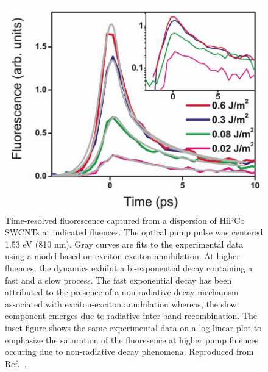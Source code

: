 \begin{figure}[H]
	\centering
	\includegraphics[scale=0.25]{images/chapter_prior_works/fluorescence_wang_2004}
	\caption{Time-resolved fluorescence captured from a dispersion of HiPCo SWCNTs at indicated fluences. The optical pump pulse was centered 1.53 eV (810 nm). Gray curves are fits to the experimental data using a model based on exciton-exciton annihilation. At higher fluences, the dynamics exhibit a bi-exponential decay containing a fast and a slow process. The fast exponential decay has been attributed to the presence of a non-radiative decay mechanism associated with exciton-exciton annihilation whereas, the slow component emerges due to radiative inter-band recombination. The inset figure shows the same experimental data on a log-linear plot to emphasize the saturation of the fluoresence at higher pump fluences occuring due to non-radiative decay phenomena. Reproduced from Ref.\ \cite{wang2004observation}.}
	\label{fig:fluorescence_wang_2004}
\end{figure}



